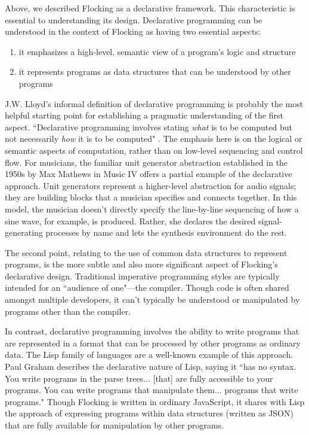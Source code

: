 \documentclass{article}
\begin{document}
Above, we described Flocking as a declarative framework. This characteristic is essential to understanding its design. Declarative programming can be understood in the context of Flocking as having two essential aspects:

\begin{enumerate}
\item it emphasizes a high-level, semantic view of a program's logic and structure
\item it represents programs as data structures that can be understood by other programs
\end{enumerate}

J.W. Lloyd's informal definition of declarative programming is probably the most helpful starting point for establishing a pragmatic understanding of the first aspect. ``Declarative programming involves stating {\it what} is to be computed but not necessarily {\it how} it is to be computed" \cite{lloyd1994practical}. The emphasis here is on the logical or semantic aspects of computation, rather than on low-level sequencing and control flow. For musicians, the familiar unit generator abstraction established in the 1950s by Max Mathews in Music IV \cite{mathews1969technology} offers a partial example of the declarative approach. Unit generators represent a higher-level abstraction for audio signals; they are building blocks that a musician specifies and connects together. In this model, the musician doesn't directly specify the line-by-line sequencing of how a sine wave, for example, is produced. Rather, she declares the desired signal-generating processes by name and lets the synthesis environment do the rest.

The second point, relating to the use of common data structures to represent programs, is the more subtle and also more significant aspect of Flocking's declarative design. Traditional imperative programming styles are typically intended for an ``audience of one"---the compiler. Though code is often shared amongst multiple developers, it can't typically be understood or manipulated by programs other than the compiler.

In contrast, declarative programming involves the ability to write programs that are represented in a format that can be processed by other programs as ordinary data. The Lisp family of languages are a well-known example of this approach. Paul Graham describes the declarative nature of Lisp, saying it ``has no syntax. You write programs in the parse trees... [that] are fully accessible to your programs. You can write programs that manipulate them... programs that write programs." Though Flocking is written in ordinary JavaScript, it shares with Lisp the approach of expressing programs within data structures (written as JSON) that are fully available for manipulation by other programs.
\end{document}
